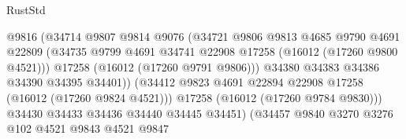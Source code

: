 \begin{lexlean}{RustStd}
\begin{coremodule}
                                          @9816
                                          (@34714
                                            @9807
                                            @9814
                                            @9076
                                            (@34721
                                              @9806
                                              @9813
                                              @4685
                                              @9790
                                              @4691
                                              @22809
                                              (@34735
                                                @9799
                                                @4691
                                                @34741
                                                @22908
                                                @17258
                                                (@16012 (@17260 @9800 @4521)))
                                              @17258
                                              (@16012 (@17260 @9791 @9806)))
                                            @34380
                                            @34383
                                            @34386
                                            @34390
                                            @34395
                                            @34401))
                                        (@34412
                                          @9823
                                          @4691
                                          @22894
                                          @22908
                                          @17258
                                          (@16012 (@17260 @9824 @4521)))
                                        @17258
                                        (@16012 (@17260 @9784 @9830)))
                                      @34430
                                      @34433
                                      @34436
                                      @34440
                                      @34445
                                      @34451)
                                    (@34457
                                      @9840
                                      @3270
                                      @3276
                                      @102
                                      @4521
                                      @9843
                                      @4521
                                      @9847

\end{coremodule}
\end{lexlean}
